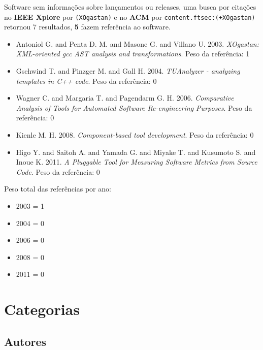 Software sem informações sobre lançamentos ou releases,
uma busca por citações no {\bf IEEE Xplore} por
\texttt{(XOgastan)}
e no {\bf ACM} por
\texttt{content.ftsec:(+XOgastan)}
retornou
7 resultados,
{\bf 5} fazem referência ao software.

\begin{itemize}
\item Antoniol G. and Penta D. M. and Masone G. and Villano U.
      2003.
      {\it XOgastan: XML-oriented gcc AST analysis and transformations}.
      Peso da referência: 1
\item Gschwind T. and Pinzger M. and Gall H.
      2004.
      {\it TUAnalyzer - analyzing templates in C++ code}.
      Peso da referência: 0
\item Wagner C. and Margaria T. and Pagendarm G. H.
      2006.
      {\it Comparative Analysis of Tools for Automated Software Re-engineering Purposes}.
      Peso da referência: 0
\item Kienle M. H.
      2008.
      {\it Component-based tool development}.
      Peso da referência: 0
\item Higo Y. and Saitoh A. and Yamada G. and Miyake T. and Kusumoto S. and Inoue K.
      2011.
      {\it A Pluggable Tool for Measuring Software Metrics from Source Code}.
      Peso da referência: 0
\end{itemize}

Peso total das referências por ano:

\begin{itemize}
\item 2003 = 1
\item 2004 = 0
\item 2006 = 0
\item 2008 = 0
\item 2011 = 0
\end{itemize}



\section{Categorias}



\subsection{Autores}

